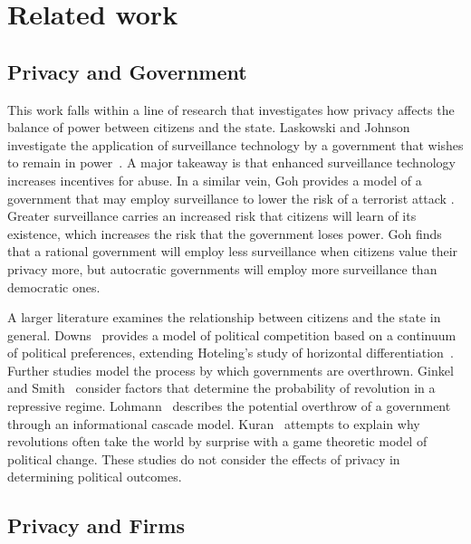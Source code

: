
\section{Related work}
\label{sec:related}

\subsection{Privacy and Government}
This work falls within a line of research that investigates how privacy affects the balance of power between citizens and the state.  Laskowski and Johnson investigate the application of surveillance technology by a government that wishes to remain in power~\cite{laskowskigovernment}.  A major takeaway is that enhanced surveillance technology increases incentives for abuse.  In a similar vein, Goh provides a model of a government that may employ surveillance to lower the risk of a terrorist attack \cite{goh2015prosperity}.  Greater surveillance carries an increased risk that citizens will learn of its existence, which increases the risk that the government loses power.  Goh finds that a rational government will employ less surveillance when citizens value their privacy more, but autocratic governments will employ more surveillance than democratic ones.

A larger literature examines the relationship between citizens and the state in general.  Downs~\cite{downs1957economic} provides a model of political competition based on a continuum of political preferences, extending Hoteling's study of horizontal differentiation~\cite{press39hotelling}.  Further studies model the process by which governments are overthrown.  Ginkel and Smith~\cite{ginkel1999so} consider factors that determine the probability of revolution in a repressive regime.  Lohmann~\cite{lohmann1994dynamics} describes the potential overthrow of a government through an informational cascade model. Kuran~\cite{kuran1989sparks} attempts to explain why revolutions often take the world by surprise with a game theoretic model of political change.  These studies do not consider the effects of privacy in determining political outcomes.

\subsection{Privacy and Firms}

